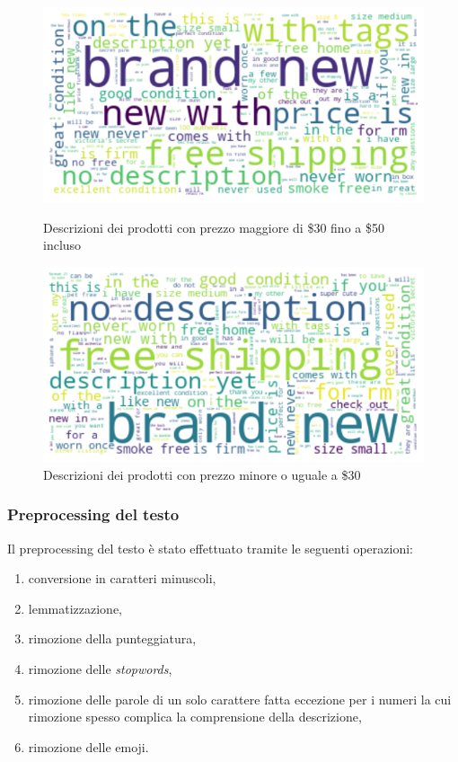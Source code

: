 \begin{figure}[H]
   \begin{minipage}{0.48\textwidth}
     \centering
     \includegraphics[width=.9\linewidth]{30_50}
	\caption{Descrizioni dei prodotti con prezzo maggiore di \$30 fino a \$50 incluso}
	\label{fig:30_50}   
	\end{minipage}\hfill
   \begin{minipage}{0.48\textwidth}
     \centering
     \includegraphics[width=.9\linewidth]{minore_30}
     \caption{Descrizioni dei prodotti con prezzo minore o uguale a \$30}
     \label{Fig:minore_30}
   \end{minipage}
\end{figure}

\subsubsection{Preprocessing del testo}

Il preprocessing del testo è stato effettuato tramite le seguenti operazioni:
\begin{enumerate}
    \item conversione in caratteri minuscoli,
    \item lemmatizzazione,
    \item rimozione della punteggiatura,
    \item rimozione delle \textit{stopwords},
    \item rimozione delle parole di un solo carattere fatta eccezione per i
    numeri la cui rimozione spesso complica la comprensione della descrizione,
    \item rimozione delle emoji.
\end{enumerate}

